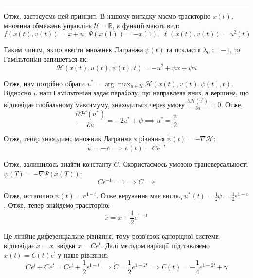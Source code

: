 \documentclass[oneside,solution]{template}
\begin{document}
\noindent\rule{8cm}{0.4pt}

Отже, застосуємо цей принцип. В нашому випадку маємо траєкторію $x(t)$, множина обмежень управлінь $\mathcal{U} = \mathbb{R}$, а функції мають вид:
\begin{equation}
    f(x(t), u(t)) = x + u, \; \Psi(x(1)) = -x(1), \; \ell(x(t), u(t)) = u^2(t)
\end{equation}

Таким чином, якщо ввести множник Лагранжа $\psi(t)$ та покласти $\lambda_0 := -1$, то Гамільтоніан запишеться як:
\begin{equation}
    \mathcal{H}(x(t), u(t), \psi(t), t) = -u^2 + \psi x + \psi u
\end{equation}

Отже, нам потрібно обрати $u^* = \arg\max_{u \in \mathcal{U}}\mathcal{H}(x(t), u(t), \psi(t), t)$. Відносно $u$ наш Гамільтоніан задає параболу, що направлена вниз, а вершина, що відповідає глобальному максимуму, знаходиться через умову $\frac{\partial \mathcal{H}(u^*)}{\partial u} = 0$. Отже, 
\begin{equation}
    \frac{\partial \mathcal{H}(u^*)}{\partial u} = -2u^* + \psi \implies u^* = \frac{\psi}{2}
\end{equation}

Отже, тепер знаходимо множник Лагранжа з рівняння $\dot{\psi}(t) = -\nabla\mathcal{H}$:
\begin{equation}
    \dot{\psi} = -\psi \implies \psi(t) = C e^{-t}
\end{equation}

Отже, залишилось знайти константу $C$. Скористаємось умовою трансверсальності $\psi(T) = -\nabla \Psi (x(T))$:
\begin{equation}
    Ce^{-1} = 1 \implies C = e
\end{equation}

Отже, остаточно $\boxed{\psi(t) = e^{1-t}}$. Отже керування має вигляд $u^*(t) = \frac{1}{2}\psi = \frac{1}{2}e^{1-t}$. Отже, тепер знайдемо траєкторію:
\begin{equation}
    \dot{x} = x + \frac{1}{2}e^{1-t}
\end{equation}

Це лінійне диференціальне рівняння, тому розв'язок однорідної системи відповідає $\dot{x} = x$, звідки $x=Ce^t$. Далі методом варіації підставляємо $x(t)=C(t)e^t$ у наше рівняння:
\begin{equation}
    \dot{C}e^t + Ce^t = Ce^t + \frac{1}{2}e^{1-t} \implies \dot{C} = \frac{1}{2}e^{1-2t} \implies C(t) = -\frac{1}{4}e^{1-2t} + \gamma
\end{equation}
\end{document}
